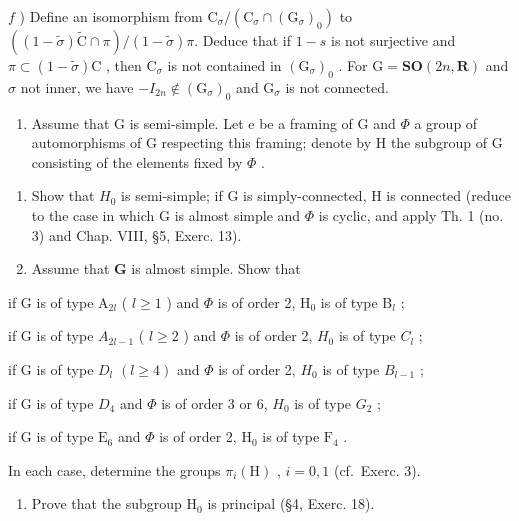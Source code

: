 \begin{enumerate}
\(f\) ) Define an isomorphism from \(\mathrm{C}_{\sigma} / (\mathrm{C}_{\sigma}\cap (\mathrm{G}_{\sigma})_{0})\) to \(((1 - \tilde{\sigma})\tilde{\mathrm{C}}\cap \pi) / (1 - \tilde{\sigma})\pi .\) Deduce that if \(1 - s\) is not surjective and \(\pi \subset (1 - \tilde{\sigma})\mathrm{C}\) , then \(\mathrm{C}_{\sigma}\) is not contained in \((\mathrm{G}_{\sigma})_{0}\) . For \(\mathrm{G} = \mathbf{SO}(2n,\mathbf{R})\) and \(\sigma\) not inner, we have \(-I_{2n}\notin (\mathrm{G}_{\sigma})_{0}\) and \(\mathrm{G}_{\sigma}\) is not connected.

\begin{enumerate}
\def\labelenumi{\arabic{enumi})}
\setcounter{enumi}{3}
\tightlist
\item
  Assume that G is semi-simple. Let e be a framing of G and \(\Phi\) a group of automorphisms of G respecting this framing; denote by H the subgroup of G consisting of the elements fixed by \(\Phi\) .
\end{enumerate}

\begin{enumerate}
\def\labelenumi{\alph{enumi})}
\item
  Show that \(H_{0}\) is semi-simple; if G is simply-connected, H is connected (reduce to the case in which G is almost simple and \(\Phi\) is cyclic, and apply Th. 1 (no. 3) and Chap. VIII, §5, Exerc. 13).
\item
  Assume that \(\mathbf{G}\) is almost simple. Show that
\end{enumerate}

if G is of type \(\mathrm{A}_{2l}\) ( \(l \geq 1\) ) and \(\varPhi\) is of order 2, \(\mathrm{H}_0\) is of type \(\mathrm{B}_l\) ;

if G is of type \(A_{2l-1}\) ( \(l \geq 2\) ) and \(\Phi\) is of order 2, \(H_{0}\) is of type \(C_{l}\) ;

if G is of type \(D_{l}\) \((l \geq 4)\) and \(\Phi\) is of order 2, \(H_{0}\) is of type \(B_{l-1}\) ;

if G is of type \(D_{4}\) and \(\Phi\) is of order 3 or 6, \(H_{0}\) is of type \(G_{2}\) ;

if \(\mathrm{G}\) is of type \(\mathrm{E}_6\) and \(\varPhi\) is of order 2, \(\mathrm{H}_0\) is of type \(\mathrm{F}_4\) .

In each case, determine the groups \(\pi_i(\mathrm{H})\) , \(i = 0,1\) (cf.~Exerc. 3).

\begin{enumerate}
\def\labelenumi{\alph{enumi})}
\setcounter{enumi}{2}
\tightlist
\item
  Prove that the subgroup \(\mathrm{H}_0\) is principal (§4, Exerc. 18).
\end{enumerate}


\end{enumerate}

